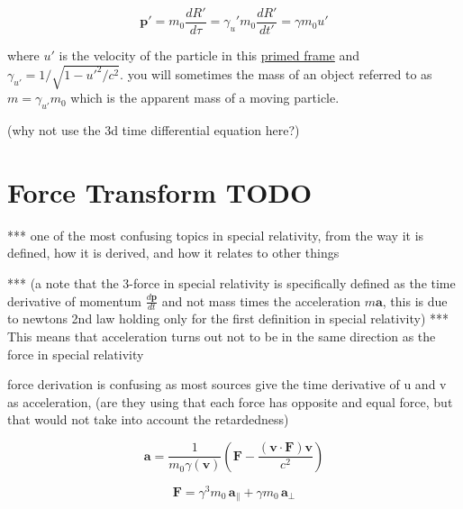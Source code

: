 \begin{equation}
	\mathbf{p}' = m_0 \frac{dR'}{d\tau}= \gamma_u' m_0 \frac{dR'}{dt'} = \gamma m_0 u'
\end{equation}

where $u'$ is the velocity of the particle in this \hyperlink{def-Primed-Frame}{primed frame} and $\gamma_{u'}= 1/\sqrt{1-u'^2/c^2}$. you will sometimes the mass of an object referred to as $m=\gamma_{u'} m_0$ which is the apparent mass of a moving particle.

(why not use the 3d time differential equation here?)

\section{Force Transform TODO}

*** one of the most confusing topics in special relativity, from the way it is defined, how it is derived, and how it relates to other things\newline

*** (a note that the 3-force in special relativity is specifically defined as the time derivative of momentum $\frac{d\mathbf{p}}{dt}$ and not mass times the acceleration $m\mathbf{a}$, this is due to newtons 2nd law holding only for the first definition in special relativity) \newline
*** This means that acceleration turns out not to be in the same direction as the force in special relativity\newline

force derivation is confusing as most sources give the time derivative of u and v as acceleration, (are they using that each force has opposite and equal force, but that would not take into account the retardedness)

\begin{equation}
	\mathbf{a} = \frac{1}{m_0 \gamma(\mathbf{v})} \left( \mathbf{F} - \frac{ ( \mathbf{v} \cdot \mathbf{F} ) \mathbf{v} }{c^2} \right)
\end{equation}

\begin{equation}
	\mathbf{F} = \gamma^3 m_0 \, \mathbf{a}_\parallel + \gamma m_0 \, \mathbf{a}_\perp
\end{equation}

